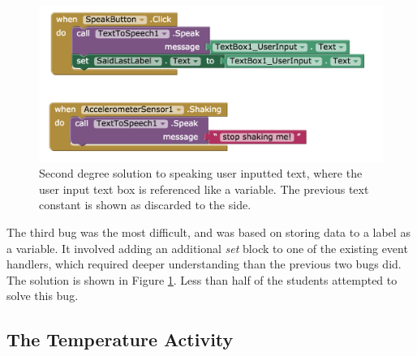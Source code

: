 \begin{figure}
  \centering
      \includegraphics[width=\textwidth]{images/debugActivity/debug3saidlast}
  \caption[Second degree solution to speaking user inputted text]{Second degree solution to speaking user inputted text, where the user input text box is referenced like a variable. The previous text constant is shown as discarded to the side.}
  \label{fig:debug3}
\end{figure}

The third bug was the most difficult, and was based on storing data to a label as a variable. It involved adding an additional \emph{set} block to one of the existing event handlers, which required deeper understanding than the previous two bugs did. The solution is shown in Figure \ref{fig:debug3}. Less than half of the students attempted to solve this bug.


\subsection{The Temperature Activity}

